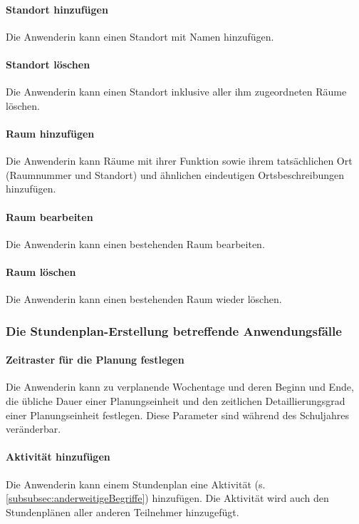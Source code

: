 \documentclass[fontsize=12pt,paper=a4,twoside]{scrartcl}
\begin{document}
\paragraph{Standort hinzufügen}
Die Anwenderin kann einen Standort mit Namen hinzufügen.

\paragraph{Standort löschen}
Die Anwenderin kann einen Standort inklusive aller ihm zugeordneten Räume löschen.

\paragraph{Raum hinzufügen}
Die Anwenderin kann Räume mit ihrer Funktion sowie ihrem tatsächlichen Ort (Raumnummer und Standort) und ähnlichen eindeutigen Ortsbeschreibungen hinzufügen.

\paragraph{Raum bearbeiten}
Die Anwenderin kann einen bestehenden Raum bearbeiten.

\paragraph{Raum löschen}
Die Anwenderin kann einen bestehenden Raum wieder löschen.



\subsubsection{Die Stundenplan-Erstellung betreffende Anwendungsfälle}

\paragraph{Zeitraster für die Planung festlegen}
Die Anwenderin kann zu verplanende Wochentage und deren Beginn und Ende, die übliche Dauer einer Planungseinheit und den zeitlichen Detaillierungsgrad einer Planungseinheit festlegen.  Diese Parameter sind während des Schuljahres veränderbar.

\paragraph{Aktivität hinzufügen}
Die Anwenderin kann einem Stundenplan eine Aktivität (s. \ref{subsubsec:anderweitigeBegriffe}) hinzufügen. Die Aktivität wird auch den Stundenplänen aller anderen Teilnehmer hinzugefügt.
\end{document}
